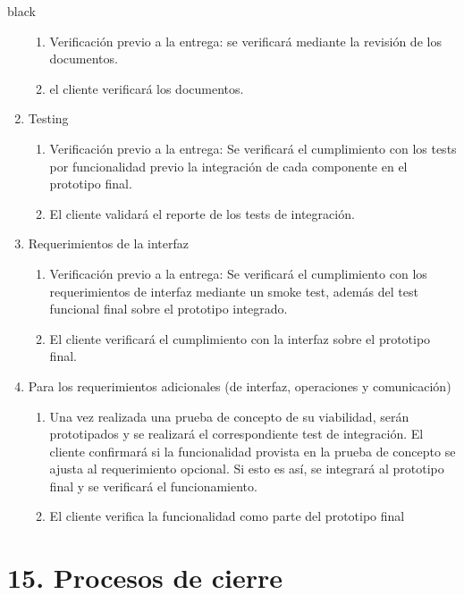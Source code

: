 \documentclass[
11pt, %
]{charter}
\begin{document}
\begin{consigna}{black}
\begin{enumerate}
		\begin{enumerate}				
			\item Verificación previo a la entrega: se verificará mediante la revisión de los documentos.			
			\item el cliente verificará los documentos.			
		\end{enumerate}			
		\item Testing
		\begin{enumerate}				
			\item Verificación previo a la entrega: Se verificará el cumplimiento con los tests por funcionalidad previo la integración de cada componente en el prototipo final. 
			\item El cliente validará el reporte de los tests de integración.
		\end{enumerate}			
		\item Requerimientos de la interfaz		
		\begin{enumerate}			
			\item Verificación previo a la entrega: Se verificará el cumplimiento con los requerimientos de interfaz mediante un smoke test, además del test funcional final sobre el prototipo integrado.			
			\item El cliente verificará el cumplimiento con la interfaz sobre el prototipo final.		
		\end{enumerate}	
		\item Para los requerimientos adicionales (de interfaz, operaciones y comunicación)
		\begin{enumerate}			
			\item Una vez realizada una prueba de concepto de su viabilidad, serán prototipados y se realizará el correspondiente test de integración. El cliente confirmará si la funcionalidad provista en la prueba de concepto se ajusta al requerimiento opcional. Si esto es así, se integrará al prototipo final y se verificará el funcionamiento.
			\item El cliente verifica la funcionalidad como parte del prototipo final
	\end{enumerate}
\end{enumerate}


\end{consigna}

\section{15. Procesos de cierre}   
\label{sec:cierre}
\end{document}
